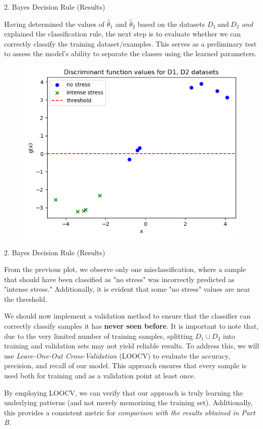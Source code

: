 \documentclass[aspectratio=169,xcolor=dvipsnames]{beamer}
\begin{document}
\begin{frame}{2. Bayes Decision Rule (Results)}

    \vspace{-5pt}

    Having determined the values of $\hat{\theta}_1$ and $\hat{\theta}_2$ based on the datasets $D_1\ \text{and}\ D_2$ \textit{and} explained the classification rule, the next step is to evaluate whether we can correctly classify the training dataset/examples. This serves as a preliminary test to assess the model's ability to separate the classes using the learned parameters.

    \vspace{-5pt}

    \begin{figure}
        \centering
        \includegraphics[width=0.5\linewidth]{out/plot3_discriminantValues.png}
        \label{fig:1}
    \end{figure}
    
\end{frame}


\begin{frame}{2. Bayes Decision Rule (Results)}

    From the previous plot, we observe only one misclassification, where a sample that should have been classified as "no stress" was incorrectly predicted as "intense stress." Additionally, it is evident that some "no stress" values are near the threshold.  

    \vspace{5pt}

    We should now implement a validation method to ensure that the classifier can correctly classify samples it has \textbf{never seen before}. It is important to note that, due to the very limited number of training samples, splitting $D_1 \cup D_2$ into training and validation sets may not yield reliable results. To address this, we will use \textit{Leave-One-Out Cross-Validation} (LOOCV) to evaluate the accuracy, precision, and recall of our model. This approach ensures that every sample is used both for training and as a validation point at least once. 
    
    By employing LOOCV, we can verify that our approach is truly learning the underlying patterns (and not merely memorizing the training set). Additionally, this provides a consistent metric for \textit{comparison with the results obtained in Part B.}
    
\end{frame}
\end{document}
